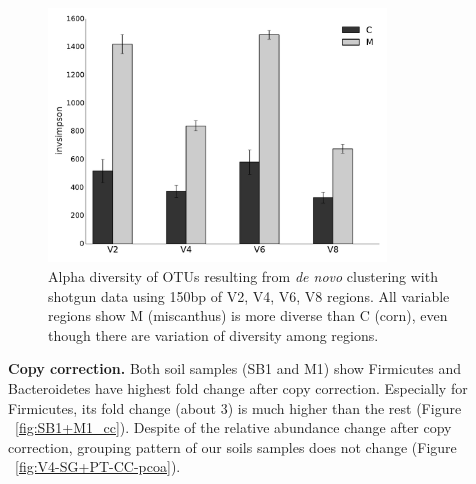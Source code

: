 \documentclass[12pt]{article}
\begin{document}
\begin{figure}[tbph!]
  \centering
  \includegraphics[width=0.8\textwidth]{figs/compare_vregion_alpha.pdf}
  \caption[Alpha diversity of OTUs resulting from {\em de novo} clustering with shotgun data using 150bp of V2, V4, V6, V8 regions]{Alpha diversity of OTUs resulting from {\em de novo} clustering with shotgun data using 150bp of V2, V4, V6, V8 regions. All variable regions show M (miscanthus) is more diverse than C (corn), even though there are variation of diversity among regions.}
  \label{fig:compare_vregion_alpha}
\end{figure}

{\bf Copy correction. }  Both soil samples (SB1 and M1) show
Firmicutes and Bacteroidetes have highest fold change after copy
correction. Especially for Firmicutes, its fold change (about 3) is
much higher than the rest (Figure ~\ref{fig:SB1+M1_cc}). Despite of
the relative abundance change after copy correction, grouping pattern
of our soils samples does not change (Figure
~\ref{fig:V4-SG+PT-CC-pcoa}).
\end{document}
